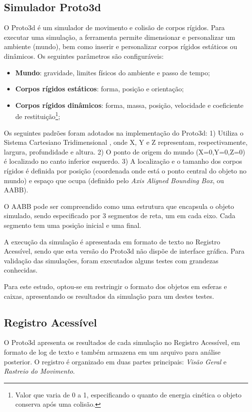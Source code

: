 \documentclass[12pt]{article}
\begin{document}
\subsection{Simulador Proto3d}
O Proto3d é um simulador de movimento e colisão de corpos rígidos. Para executar uma simulação, a ferramenta permite dimensionar e personalizar um ambiente (mundo), bem como inserir e personalizar corpos rígidos estáticos ou dinâmicos. Os seguintes parâmetros são configuráveis:
\begin{itemize}
	\item \textbf{Mundo}: gravidade, limites físicos do ambiente e passo de tempo;
	\item \textbf{Corpos rígidos estáticos}: forma, posição e orientação;
	\item \textbf{Corpos rígidos dinâmicos}: forma, massa, posição, velocidade e coeficiente de restituição\footnote{Valor que varia de 0 a 1, especificando o quanto de energia cinética o objeto conserva após uma colisão.};
\end{itemize}
%
Os seguintes padrões foram adotados na implementação do Proto3d: 1) Utiliza o Sistema Cartesiano Tridimensional \cite{thibaut2004proyecto}, onde X, Y e Z representam, respectivamente, largura, profundidade e altura. 2) O ponto de origem do mundo (X=0,Y=0,Z=0) é localizado no canto inferior esquerdo. 3) A localização e o tamanho dos corpos rígidos é definida por posição (coordenada onde está o ponto central do objeto no mundo) e espaço que ocupa (definido pelo \textit{Axis Aligned Bounding Box}, ou AABB). 

O AABB pode ser compreendido como uma estrutura que encapsula o objeto simulado, sendo especificado por 3 segmentos de reta, um em cada eixo. Cada segmento tem uma posição inicial e uma final.

A execução da simulação é apresentada em formato de texto no Registro Acessível, sendo que esta versão do Proto3d não dispõe de interface gráfica. Para validação das simulações, foram executados alguns testes com grandezas conhecidas. 

Para este estudo, optou-se em restringir o formato dos objetos em esferas e caixas, apresentando os resultados da simulação para um destes testes.

\subsection{Registro Acessível}
O Proto3d apresenta os resultados de cada simulação no Registro Acessível, em formato de log de texto e também armazena em um arquivo para análise posterior. O registro é organizado em duas partes principais: \emph{Visão Geral} e \emph{Rastreio do Movimento}.
\end{document}
